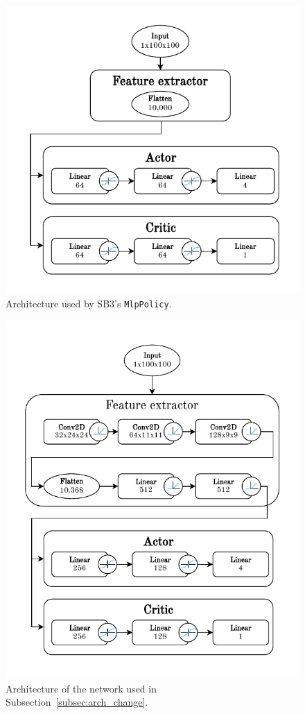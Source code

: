 \documentclass[
  digital,     %
  oneside,     %
  nosansbold,  %
  nocolorbold, %
  lof,         %
  lot,         %
]{fithesis4}
\begin{document}
\begin{figure}
    \includegraphics[width=1\linewidth]{diagrams/mlp_arch.pdf}
    \caption{Architecture used by SB3's \texttt{MlpPolicy}.}
    \label{fig:mlp_policy}
\end{figure}

\begin{figure}
    \includegraphics[width=1\linewidth]{diagrams/bigger_net_arch.pdf}
    \caption{Architecture of the network used in Subsection~\ref{subsec:arch_change}.}
    \label{fig:bigger_net_policy}
\end{figure}
\end{document}
